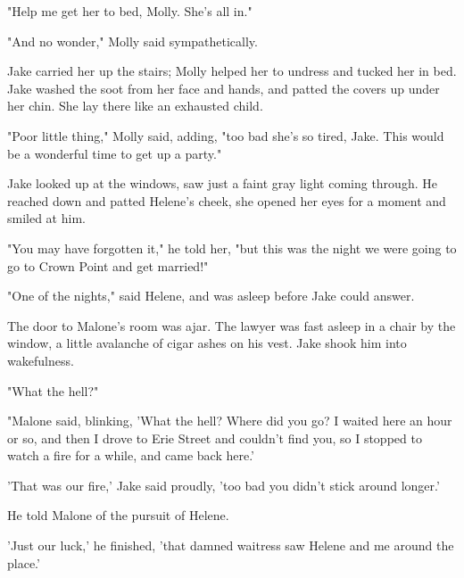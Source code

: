 \documentclass{novel}
\begin{document}
"Help me get her to bed, Molly. She’s all in."

"And no wonder," Molly said sympathetically.

Jake carried her up the stairs; Molly helped her to undress and tucked her in bed. Jake washed the soot from her face and hands, and patted the covers up under her chin. She lay there like an exhausted child.

"Poor little thing," Molly said, adding, "too bad she’s so tired, Jake. This would be a wonderful time to get up a party."

Jake looked up at the windows, saw just a faint gray light coming through. He reached down and patted Helene’s cheek, she opened her eyes for a moment and smiled at him.

"You may have forgotten it," he told her, "but this was the night we were going to go to Crown Point and get married!"

"One of the nights," said Helene, and was asleep before Jake could answer.

\begin{ChapterStart}
\vspace{3\nbs}
\end{ChapterStart}

The door to Malone’s room was ajar. The lawyer was fast asleep in a chair by the window, a little avalanche of cigar ashes on his vest. Jake shook him into wakefulness.

"What the hell?"

"Malone said, blinking, 'What the hell? Where did you go? I waited here an hour or so, and then I drove to Erie Street and couldn’t find you, so I stopped to watch a fire for a while, and came back here.'

'That was our fire,' Jake said proudly, 'too bad you didn’t stick around longer.'

He told Malone of the pursuit of Helene.

'Just our luck,' he finished, 'that damned waitress saw Helene and me around the place.'
\end{document}
